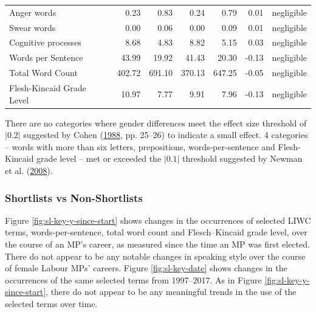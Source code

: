 \documentclass[]{article}
\theoremstyle{definition}
\theoremstyle{definition}
\theoremstyle{definition}
\theoremstyle{remark}
\begin{document}
\begin{table}[H]
\begin{tabular}[t]{lrrrrrl}
Anger words & 0.23 & 0.83 & 0.24 & 0.79 & 0.01 & negligible\\
Swear words & 0.00 & 0.06 & 0.00 & 0.09 & 0.01 & negligible\\
Cognitive processes & 8.68 & 4.83 & 8.82 & 5.15 & 0.03 & negligible\\
\addlinespace
Words per Sentence & 43.99 & 19.92 & 41.43 & 20.30 & -0.13 & negligible\\
Total Word Count & 402.72 & 691.10 & 370.13 & 647.25 & -0.05 & negligible\\
Flesh-Kincaid Grade Level & 10.97 & 7.77 & 9.91 & 7.96 & -0.13 & negligible\\
\bottomrule
\end{tabular}
\end{table}

There are no categories where gender differences meet the effect size
threshold of \(|0.2|\) suggested by Cohen
(\protect\hyperlink{ref-cohen1988}{1988}, pp. 25--26) to indicate a
small effect. 4 categories -- words with more than six letters,
prepositions, words-per-sentence and Flesh-Kincaid grade level -- met or
exceeded the \(|0.1|\) threshold suggested by Newman et al.
(\protect\hyperlink{ref-newman2008}{2008}).

\hypertarget{shortlists-vs-non-shortlists}{%
\subsubsection{Shortlists vs
Non-Shortlists}\label{shortlists-vs-non-shortlists}}

Figure \ref{fig:sl-key-y-since-start} shows changes in the occurrences
of selected LIWC terms, words-per-sentence, total word count and
Flesch--Kincaid grade level, over the course of an MP's career, as
measured since the time an MP was first elected. There do not appear to
be any notable changes in speaking style over the course of female
Labour MPs' careers. Figure \ref{fig:sl-key-date} shows changes in the
occurrences of the same selected terms from 1997--2017. As in Figure
\ref{fig:sl-key-y-since-start}, there do not appear to be any meaningful
trends in the use of the selected terms over time.
\end{document}
